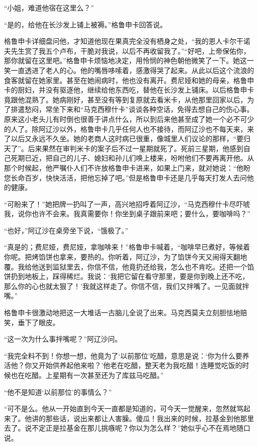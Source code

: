 \par “小姐，难道他宿在这里么？”
\par “是的，给他在长沙发上铺上被褥。”格鲁申卡回答说。
\par 格鲁申卡详细盘问他，才知道他现在果真完全没有栖身之处，“我的恩人卡尔干诺夫先生赏了我五个卢布，干脆对我说，以后不再收留我了。”“好吧，上帝保佑你，那你就留在这里吧。”格鲁申卡烦恼地决定，用怜悯的神色朝他微笑了一下。她这一笑一直透进了老人的心。他的嘴唇哆嗦着，感激得哭了起来。从此以后这个流浪的食客就留在她家里。甚至在她闹病时，他也没有离开。费尼娅和她的母亲，格鲁申卡的厨妇，并没有驱逐他，继续给他东西吃，替他在长沙发上铺床。以后格鲁申卡竟跟他混熟了。她病刚好，甚至没有等到复原就去看米卡，从他那里回家以后，为了排遣愁闷，常坐下来和“马克西穆什卡”谈谈各种空话，免得去想自己的伤心事。原来这小老头儿有时倒也很善于讲点什么，所以到后来他甚至成了她一个必不可少的人了。除阿辽沙以外，格鲁申卡几乎任何人也不接待，而阿辽沙也不每天来，来了以后又永远不久坐。她的老商人这时病已很重，像城里人们议论的那样，“要归天了”。后来果然在审判米卡的案子后不过一星期就死了。死前三星期，他感到自己死期已近，把自己的儿子、媳妇和孙儿们唤上楼来，吩咐他们不要再离开他。从那个时候起，他严嘱仆人们不许放格鲁申卡进来，如果上门来，就对她说：“他盼您长命百岁，快快活活，把他忘掉了吧。”但是格鲁申卡还是几乎每天打发人去问他的健康。
\par “可盼来了！”她把牌一扔叫了一声，高兴地招呼着阿辽沙，“马克西穆什卡尽吓唬我，说你也许不会来。我真需要你！你坐到桌子跟前来吧；要什么，要咖啡吗？”
\par “也好，”阿辽沙在桌旁坐下说，“饿极了。”
\par “真是的；费尼娅，费尼娅，拿咖啡来！”格鲁申卡喊着，“咖啡早已煮好，等候着你呢。把烤馅饼也拿来，要热的。你听着，阿辽沙，为了馅饼今天又闹得天翻地覆。我给他送到监狱里去，你信不信，他竟扔还给我，怎么也不肯吃。还把一个馅饼扔到地板上，踩得稀烂。我说：‘我把它留在看守那里，要是你到晚上还不吃，那么你的心也就太狠了！’我就这样走了。你信不信，我们又拌嘴了。一见面就拌嘴。”
\par 格鲁申卡很激动地把这一大堆话一古脑儿全说了出来。马克西莫夫立刻胆怯地赔笑，垂下了眼皮。
\par “这一次为什么事拌嘴呢？”阿辽沙问。
\par “我完全料不到！你想一想，他竟为了‘以前那位’吃醋，意思是说：‘你为什么要养活他？你又开始供养起他来啦？’他老在吃醋，整天老为我吃醋！连睡觉吃饭的时候也在吃醋。上星期有一次甚至还为了库兹马吃醋。”
\par “他不是知道‘以前那位’的事情么？”
\par “可不是么。他从一开始直到今天一直都是知道的，可今天一觉醒来，忽然就骂起来了。他讲的那些话，说出来都让人害臊。傻瓜！我出来的时候，拉基金到他那里去了。说不定正是拉基金在那儿挑嗾呢？你以为怎么样？”她似乎心不在焉地随口说。
